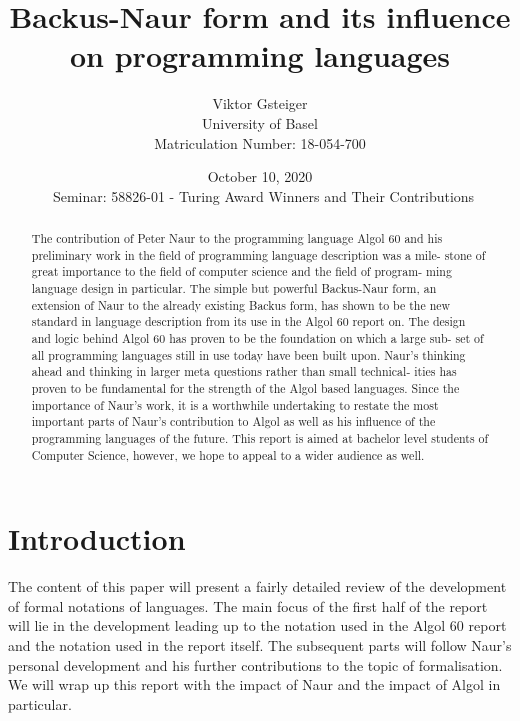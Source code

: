 \documentclass{article}
\author{Viktor Gsteiger \\ University of Basel \\ Matriculation Number: 18-054-700}
\title{Backus-Naur form and its influence on programming languages}
\date{October 10, 2020 \\\ Seminar: 58826-01 - Turing Award Winners and Their Contributions}
\begin{document}
\maketitle

\begin{abstract}
	The contribution of Peter Naur to the programming language Algol 60 and his preliminary work in the field of programming language description was a mile- stone of great importance to the field of computer science and the field of program- ming language design in particular. The simple but powerful Backus-Naur form, an extension of Naur to the already existing Backus form, has shown to be the new standard in language description from its use in the Algol 60 report on. The design and logic behind Algol 60 has proven to be the foundation on which a large sub- set of all programming languages still in use today have been built upon. Naur’s thinking ahead and thinking in larger meta questions rather than small technical- ities has proven to be fundamental for the strength of the Algol based languages. Since the importance of Naur’s work, it is a worthwhile undertaking to restate the most important parts of Naur’s contribution to Algol as well as his influence of the programming languages of the future. This report is aimed at bachelor level students of Computer Science, however, we hope to appeal to a wider audience as well.
\end{abstract}

\newpage

\section{Introduction}
The content of this paper will present a fairly detailed review of the development of formal notations of languages. The main focus of the first half of the report will lie in the development leading up to the notation used in the Algol 60 report and the notation used in the report itself. The subsequent parts will follow Naur’s personal development and his further contributions to the topic of formalisation. We will wrap up this report with the impact of Naur and the impact of Algol in particular.
\end{document}
